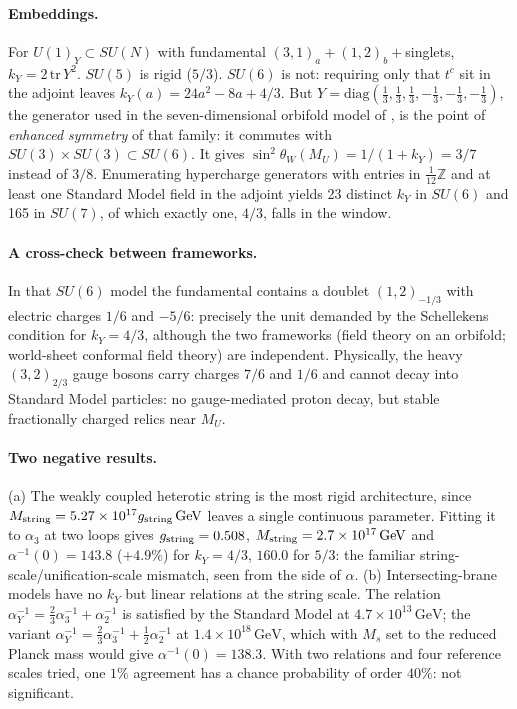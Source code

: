 \documentclass[11pt,a4paper]{article}
\newcommand{\ainv}{\alpha^{-1}}
\newcommand{\kY}{k_Y}
\newcommand{\GeV}{\,\mathrm{GeV}}
\newcommand{\MU}{M_U}
\begin{document}
\paragraph{Embeddings.} For $U(1)_Y\subset SU(N)$ with fundamental $(3,1)_a+(1,2)_b+$singlets, $\kY=2\,\mathrm{tr}\,Y^2$. $SU(5)$
is rigid ($5/3$). $SU(6)$ is not: requiring only that $t^c$ sit in the adjoint leaves $\kY(a)=24a^2-8a+4/3$. But
$Y=\mathrm{diag}(\tfrac13,\tfrac13,\tfrac13,-\tfrac13,-\tfrac13,-\tfrac13)$, the generator used in the seven-dimensional
orbifold model of \cite{BJLL2}, is the point of \emph{enhanced symmetry} of that family: it commutes with
$SU(3)\times SU(3)\subset SU(6)$. It gives $\sin^2\theta_W(\MU)=1/(1+\kY)=3/7$ instead of $3/8$. Enumerating
hypercharge generators with entries in $\frac1{12}\mathbb Z$ and at least one Standard Model field in the adjoint yields
23 distinct $\kY$ in $SU(6)$ and 165 in $SU(7)$, of which exactly one, $4/3$, falls in the window.

\paragraph{A cross-check between frameworks.} In that $SU(6)$ model the fundamental contains a doublet $(1,2)_{-1/3}$ with
electric charges $1/6$ and $-5/6$: precisely the unit demanded by the Schellekens condition for $\kY=4/3$, although the two
frameworks (field theory on an orbifold; world-sheet conformal field theory) are independent. Physically, the heavy
$(3,2)_{2/3}$ gauge bosons carry charges $7/6$ and $1/6$ and cannot decay into Standard Model particles: no gauge-mediated
proton decay, but stable fractionally charged relics near $\MU$.

\paragraph{Two negative results.} (a) The weakly coupled heterotic string is the most rigid architecture, since
$M_{\rm string}=5.27\times10^{17}g_{\rm string}\GeV$ \cite{Kaplunovsky} leaves a single continuous parameter. Fitting it to
$\alpha_3$ at two loops gives $g_{\rm string}=0.508$, $M_{\rm string}=2.7\times10^{17}\GeV$ and $\ainv(0)=143.8$ ($+4.9\%$) for
$\kY=4/3$, $160.0$ for $5/3$: the familiar string-scale/unification-scale mismatch, seen from the side of $\alpha$.
(b) Intersecting-brane models have no $\kY$ but linear relations at the string scale. The relation
$\ainv_Y=\tfrac23\ainv_3+\ainv_2$ \cite{BLS} is satisfied by the Standard Model at $4.7\times10^{13}\GeV$; the variant
$\ainv_Y=\tfrac23\ainv_3+\tfrac12\ainv_2$ \cite{KokorelisLike} at $1.4\times10^{18}\GeV$, which with $M_s$ set to the reduced Planck
mass would give $\ainv(0)=138.3$. With two relations and four reference scales tried, one $1\%$ agreement has a chance
probability of order $40\%$: not significant.
\end{document}
